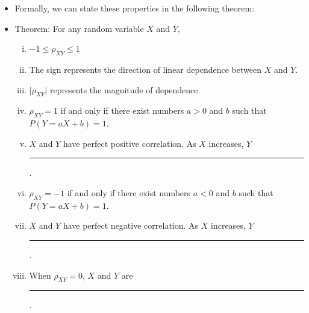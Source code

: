 \documentclass{article}
\newcommand{\blankul}[1]{\rule[-1.5mm]{#1}{0.15mm}}	%
\begin{document}
\begin{itemize}
\begin{itemize}
    \end{itemize}
    \item Formally, we can state these properties in the following theorem:
    \item[] Theorem: For any random variable $X$ and $Y$,
    \begin{enumerate}[(i)]
        \item $-1 \le \rho_{XY} \le 1$ 
        \item[] The sign represents the direction of linear dependence between $X$ and $Y$.
        \item[] $\lvert \rho_{XY} \rvert$ represents the magnitude of dependence. 
        \item $\rho_{XY} = 1$ if and only if there exist numbers $a > 0$ and $b$ such that \\$P(Y = aX + b) = 1$.
        \item[] $X$ and $Y$ have perfect positive correlation. As $X$ increases, $Y$ \blankul{3cm}.
        \item $\rho_{XY} = -1$ if and only if there exist numbers $a < 0$ and $b$ such that \\$P(Y = aX + b) = 1$. 
        \item[] $X$ and $Y$ have perfect negative correlation. As $X$ increases, $Y$ \blankul{3cm}.
        \item When $\rho_{XY} = 0$, $X$ and $Y$ are \blankul{3cm}.
    \end{enumerate}
\end{itemize}\bigskip
\end{document}
